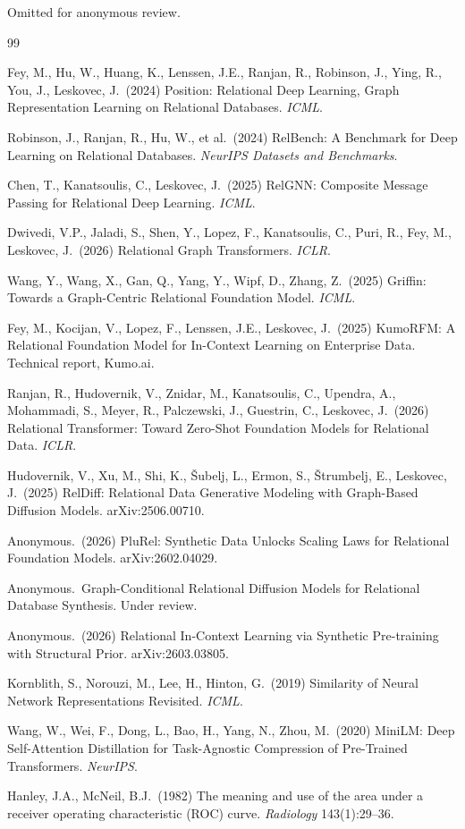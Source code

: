 \documentclass{article}
\begin{document}
\begin{ack}
Omitted for anonymous review.
\end{ack}

{\small
\begin{thebibliography}{99}

 Fey, M., Hu, W., Huang, K., Lenssen, J.E., Ranjan, R., Robinson, J., Ying, R., You, J., Leskovec, J.\ (2024) Position: Relational Deep Learning, Graph Representation Learning on Relational Databases. \emph{ICML}.

 Robinson, J., Ranjan, R., Hu, W., et al.\ (2024) RelBench: A Benchmark for Deep Learning on Relational Databases. \emph{NeurIPS Datasets and Benchmarks}.

 Chen, T., Kanatsoulis, C., Leskovec, J.\ (2025) RelGNN: Composite Message Passing for Relational Deep Learning. \emph{ICML}.

 Dwivedi, V.P., Jaladi, S., Shen, Y., Lopez, F., Kanatsoulis, C., Puri, R., Fey, M., Leskovec, J.\ (2026) Relational Graph Transformers. \emph{ICLR}.

 Wang, Y., Wang, X., Gan, Q., Yang, Y., Wipf, D., Zhang, Z.\ (2025) Griffin: Towards a Graph-Centric Relational Foundation Model. \emph{ICML}.

 Fey, M., Kocijan, V., Lopez, F., Lenssen, J.E., Leskovec, J.\ (2025) KumoRFM: A Relational Foundation Model for In-Context Learning on Enterprise Data. Technical report, Kumo.ai.

 Ranjan, R., Hudovernik, V., Znidar, M., Kanatsoulis, C., Upendra, A., Mohammadi, S., Meyer, R., Palczewski, J., Guestrin, C., Leskovec, J.\ (2026) Relational Transformer: Toward Zero-Shot Foundation Models for Relational Data. \emph{ICLR}.

 Hudovernik, V., Xu, M., Shi, K., \v{S}ubelj, L., Ermon, S., \v{S}trumbelj, E., Leskovec, J.\ (2025) RelDiff: Relational Data Generative Modeling with Graph-Based Diffusion Models. arXiv:2506.00710.

 Anonymous.\ (2026) PluRel: Synthetic Data Unlocks Scaling Laws for Relational Foundation Models. arXiv:2602.04029.

 Anonymous.\ Graph-Conditional Relational Diffusion Models for Relational Database Synthesis. Under review.

 Anonymous.\ (2026) Relational In-Context Learning via Synthetic Pre-training with Structural Prior. arXiv:2603.03805.

 Kornblith, S., Norouzi, M., Lee, H., Hinton, G.\ (2019) Similarity of Neural Network Representations Revisited. \emph{ICML}.

 Wang, W., Wei, F., Dong, L., Bao, H., Yang, N., Zhou, M.\ (2020) MiniLM: Deep Self-Attention Distillation for Task-Agnostic Compression of Pre-Trained Transformers. \emph{NeurIPS}.

 Hanley, J.A., McNeil, B.J.\ (1982) The meaning and use of the area under a receiver operating characteristic (ROC) curve. \emph{Radiology} 143(1):29--36.

\end{thebibliography}
}
\end{document}
